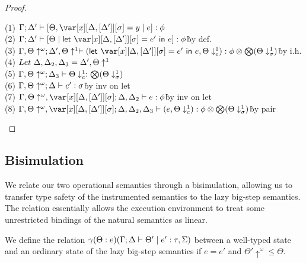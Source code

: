 \documentclass[acmsmall,review,anonymous,screen]{acmart}
\newcommand{\llet}[2]{\mathsf{let}~#1~\mathsf{in}~#2}
\begin{document}
\begin{proof}
\begin{description}
\begin{tabbing}
    (1) $\G; \D' \vdash \left[ \Theta, \xD = y \mid e \right] : \phi$\\
    (2) $\G; \D' \vdash \left[ \Theta \mid \llet{\xD = e'}{e} \right] : \phi$\` by def.\\
    (3) $\G, \Theta\uparrow^\omega; \D', \Theta\uparrow^1 \vdash (\llet{\xD = e'}{e}, \Theta\downarrow^1_e) : \phi \otimes \bigotimes(\Theta\downarrow^1_\sigma)$\` by i.h.\\
    (4) $Let~\Delta,\Delta_2,\Delta_3 = \Delta', \Theta\uparrow^1 $\\
    (5) $\Gamma, \Theta\uparrow^\omega; \Delta_3 \vdash \Theta\downarrow^1_e : \bigotimes(\Theta\downarrow^1_\sigma)$\\
    (6) $\Gamma, \Theta\uparrow^\omega; \Delta \vdash e' : \sigma$\` by inv on let\\
    (7) $\G, \Theta\uparrow^\omega, \xD; \D,\D_2 \vdash e : \phi $\` by inv on let\\
    (8) $\G, \Theta\uparrow^\omega, \xD; \D,\D_2,\D_3 \vdash (e, \Theta\downarrow^1_e) : \phi \otimes \bigotimes(\Theta\downarrow^1_\sigma)$\` by pair\\
\end{tabbing}
\end{description}
\end{proof}


\subsection{Bisimulation}


We relate our two operational semantics through a bisimulation,
allowing us to transfer type safety of the instrumented semantics to
the lazy big-step semantics. The relation essentially allows the
execution environment to treat some unrestricted bindings
of the natural semantics as linear.

\begin{definition}[Bisimulation]
We define the relation $\gamma(\Theta : e)(\Gamma ; \Delta \vdash \Theta' \mid
e' : \tau,\Sigma)$ between a well-typed state and an ordinary state of
the lazy big-step semantics if $e = e'$ and $\Theta'{\uparrow^\omega}
\leq \Theta$.
\end{definition}
\end{document}
